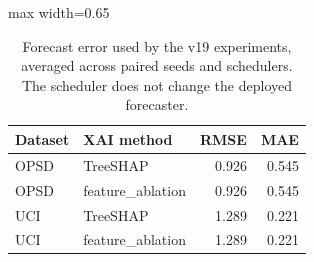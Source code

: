 
\begin{table}[t]
\centering
\caption{Forecast error used by the v19 experiments, averaged across paired seeds and schedulers. The scheduler does not change the deployed forecaster.}
\label{tab:forecast}

\scriptsize
\setlength{\tabcolsep}{6pt}
\renewcommand{\arraystretch}{1.08}

\begin{adjustbox}{max width=0.65\textwidth}
\begin{tabular}{llrr}
\toprule
Dataset & XAI method & RMSE & MAE \\
\midrule

OPSD & TreeSHAP & 0.926 & 0.545 \\
OPSD & feature\_ablation & 0.926 & 0.545 \\
UCI & TreeSHAP & 1.289 & 0.221 \\
UCI & feature\_ablation & 1.289 & 0.221 \\

\bottomrule
\end{tabular}
\end{adjustbox}
\end{table}